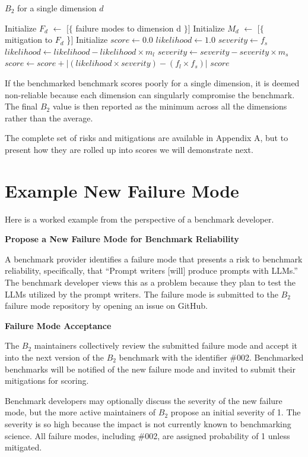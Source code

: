\documentclass{article}
\newcommand\bb{$B_2$ }
\begin{document}
\begin{algorithm}
\caption{\bb for a single dimension $d$}
\label{alg:b2}
\begin{algorithmic}[1]
\State Initialize $F_d$ $\gets$ $[ \{$ failure modes to dimension d $\} ]$
\State Initialize $M_d$ $\gets$ $[ \{$ mitigation to $F_d$ \}$ ]$
\State Initialize $score \gets 0.0$
    \State $likelihood \gets 1.0$
    \State $severity \gets f_s$
        \State $likelihood \gets likelihood - likelihood \times m_l$
        \State $severity \gets severity - severity \times m_s$
    \EndFor
    \State $score \gets score + |(likelihood\times severity) - (f_l\times f_s)|$
\EndFor
\State \Return $score$
\end{algorithmic}
\end{algorithm}

If the benchmarked benchmark scores poorly for a single dimension, it is deemed non-reliable because each dimension can singularly compromise the benchmark. The final \bb value is then reported as the minimum across all the dimensions rather than the average.

The complete set of risks and mitigations are available in Appendix A, but to present how they are rolled up into scores we will demonstrate next.
\section{Example New Failure Mode}
Here is a worked example from the perspective of a benchmark developer.

\textbf{Propose a New Failure Mode for Benchmark Reliability}

A benchmark provider identifies a failure mode that presents a risk to benchmark reliability, specifically, that ``Prompt writers [will] produce prompts with LLMs.'' The benchmark developer views this as a problem because they plan to test the LLMs utilized by the prompt writers. The failure mode is submitted to the \bb failure mode repository by opening an issue on GitHub.

\textbf{Failure Mode Acceptance}

The \bb maintainers collectively review the submitted failure mode and accept it into the next version of the \bb benchmark with the identifier \#002. Benchmarked benchmarks will be notified of the new failure mode and invited to submit their mitigations for scoring.

Benchmark developers may optionally discuss the severity of the new failure mode, but the more active maintainers of \bb propose an initial severity of 1. The severity is so high because the impact is not currently known to benchmarking science. All failure modes, including \#002, are assigned probability of 1 unless mitigated.
\end{document}
